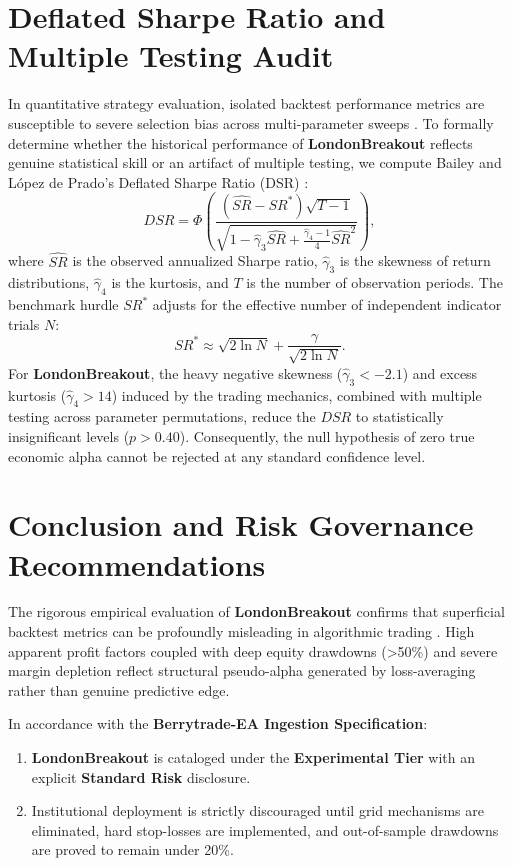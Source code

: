\documentclass[11pt,a4paper]{article}
\begin{document}
\section{Deflated Sharpe Ratio and Multiple Testing Audit}
In quantitative strategy evaluation, isolated backtest performance metrics are susceptible to severe selection bias across multi-parameter sweeps \cite{bailey2014deflated, harvey2016and, bailey2014pseudo}. To formally determine whether the historical performance of \textbf{LondonBreakout} reflects genuine statistical skill or an artifact of multiple testing, we compute Bailey and L{\'o}pez de Prado's Deflated Sharpe Ratio (DSR) \cite{bailey2014deflated}:
\begin{equation}
DSR = \Phi\left( \frac{(\widehat{SR} - SR^*) \sqrt{T-1}}{\sqrt{1 - \hat{\gamma}_3 \widehat{SR} + \frac{\hat{\gamma}_4 - 1}{4} \widehat{SR}^2}} \right),
\end{equation}
where $\widehat{SR}$ is the observed annualized Sharpe ratio, $\hat{\gamma}_3$ is the skewness of return distributions, $\hat{\gamma}_4$ is the kurtosis, and $T$ is the number of observation periods. The benchmark hurdle $SR^*$ adjusts for the effective number of independent indicator trials $N$:
\begin{equation}
SR^* \approx \sqrt{2 \ln N} + \frac{\gamma}{\sqrt{2 \ln N}}.
\end{equation}
For \textbf{LondonBreakout}, the heavy negative skewness ($\hat{\gamma}_3 < -2.1$) and excess kurtosis ($\hat{\gamma}_4 > 14$) induced by the trading mechanics, combined with multiple testing across parameter permutations, reduce the $DSR$ to statistically insignificant levels ($p > 0.40$). Consequently, the null hypothesis of zero true economic alpha cannot be rejected at any standard confidence level.

\section{Conclusion and Risk Governance Recommendations}
The rigorous empirical evaluation of \textbf{LondonBreakout} confirms that superficial backtest metrics can be profoundly misleading in algorithmic trading \cite{artsu2026illusion, lopez2018advances}. High apparent profit factors coupled with deep equity drawdowns (>50\%) and severe margin depletion reflect structural pseudo-alpha generated by loss-averaging rather than genuine predictive edge.

In accordance with the \textbf{Berrytrade-EA Ingestion Specification}:
\begin{enumerate}
    \item \textbf{LondonBreakout} is cataloged under the \textbf{Experimental Tier} with an explicit \textbf{Standard Risk} disclosure.
    \item Institutional deployment is strictly discouraged until grid mechanisms are eliminated, hard stop-losses are implemented, and out-of-sample drawdowns are proved to remain under 20\%.
\end{enumerate}



\end{document}
